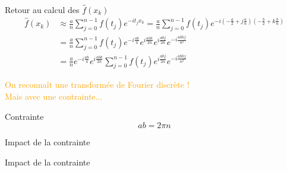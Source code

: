 \documentclass{beamer}
\begin{document}
\begin{frame}{Retour au calcul des $\hat{f}(x_k)$}
    \begin{align*}
        \hat{f}(x_k) &\approx \frac{a}{n}\sum_{j=0}^{n-1}f(t_j)e^{-i t_j x_k}  
        =\frac{a}{n} \sum_{j=0}^{n-1}f(t_j)e^{-i (-\frac{a}{2}+j\frac{a}{n})(-\frac{b}{2}+k\frac{b}{n})} \\
        &=\frac{a}{n} \sum_{j=0}^{n-1}f(t_j)e^{-i\frac{ab}{4}}e^{i\frac{abk}{2n}}e^{i\frac{abj}{2n}}e^{-i\frac{abkj}{n^2}} \\
        &=\frac{a}{n} e^{-i\frac{ab}{4}}e^{i\frac{abk}{2n}}\sum_{j=0}^{n-1}f(t_j)e^{i\frac{abj}{2n}}e^{-i\frac{abkj}{n^2}} 
    \end{align*}
    \begin{center}
        \textcolor{orange}{On reconnaît une transformée de Fourier discrète ! \\ Mais avec une contrainte...}
    \end{center}
    \begin{alertblock}{Contrainte}
        $$ab =2 \pi n$$
    \end{alertblock}
\end{frame}

\begin{frame}{Impact de la contrainte}
\begin{center}
\end{center}
\end{frame}

\begin{frame}{Impact de la contrainte}
\end{frame}
\end{document}
